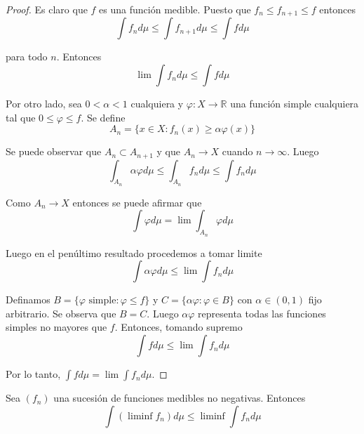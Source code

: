 \begin{proof}
	Es claro que $f$ es una función medible. Puesto que $f_n \leq f_{n+1} \leq f$ entonces
	\begin{equation}
		\int f_n d\mu \leq \int f_{n+1} d\mu \leq \int f d\mu
	\end{equation}
	
	para todo $n$. Entonces
	\begin{equation}
		\lim \int f_n d\mu \leq \int f d\mu
	\end{equation}
	
	Por otro lado, sea $0 < \alpha < 1$ cualquiera y $\varphi: X \rightarrow \mathbb{R}$ una función simple cualquiera tal que $0 \leq \varphi \leq f$. Se define
	\begin{equation}
		A_n = \{ x \in X: f_n(x) \geq \alpha \varphi(x) \}
	\end{equation}
	
	Se puede observar que $A_n \subset A_{n+1}$ y que $A_n \rightarrow X$ cuando $n \rightarrow \infty$. Luego
	\begin{equation}
		\int_{A_n} \alpha \varphi d\mu \leq \int_{A_n} f_n d\mu \leq \int f_n d\mu
	\end{equation}
	
	Como $A_n \rightarrow X$ entonces se puede afirmar que
	\begin{equation}
		\int \varphi d\mu = \lim \int_{A_n} \varphi d\mu
	\end{equation}
	
	Luego en el penúltimo resultado procedemos a tomar limite
	\begin{equation}
		\int \alpha \varphi d\mu \leq \lim \int f_n d\mu
	\end{equation}
	
	Definamos $B=\{\varphi \text{ simple}: \varphi \leq f \}$ y $C = \{ \alpha \varphi: \varphi \in B \}$ con \mbox{$\alpha \in (0,1)$} fijo arbitrario. Se observa que $B=C$. Luego $\alpha \varphi$ representa todas las funciones simples no mayores que $f$. Entonces, tomando supremo
	\begin{equation}
		\int f d\mu \leq \lim \int f_n d\mu
	\end{equation}	
	
	Por lo tanto, $\int f d\mu = \lim \int f_n d\mu$.
\end{proof}

\begin{teorema}\label{fatou}
	Sea $(f_n)$ una sucesión de funciones medibles no negativas. Entonces
	\begin{equation}
		\int (\liminf f_n) d\mu \leq \liminf \int f_n d\mu
	\end{equation}
\end{teorema}

